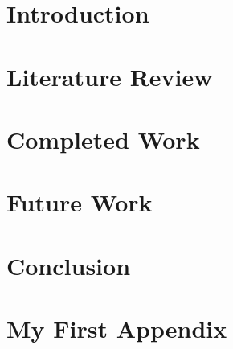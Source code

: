 \documentclass[a4paper,11pt,twoside]{report}
\author{\me}
\begin{document}


\normalsize

%

\tableofcontents

\chapter{Introduction}\label{chapter:Introduction}
\setcounter{page}{0}


\chapter{Literature Review}\label{chapter:Literature Review}


\chapter{Completed Work}\label{chapter:Completed Work}


\chapter{Future Work}\label{chapter:Future Work}


\chapter{Conclusion}\label{chapter:Conclusion}




\newpage

\appendix
\chapter{My First Appendix}\label{chapter:Appendix A}

\end{document}
